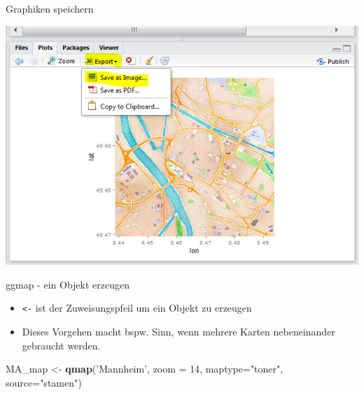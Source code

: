 \documentclass[ignorenonframetext,]{beamer}
\newenvironment{Shaded}{\begin{snugshade}}{\end{snugshade}}
\newcommand{\DataTypeTok}[1]{\textcolor[rgb]{0.13,0.29,0.53}{#1}}
\newcommand{\DecValTok}[1]{\textcolor[rgb]{0.00,0.00,0.81}{#1}}
\newcommand{\KeywordTok}[1]{\textcolor[rgb]{0.13,0.29,0.53}{\textbf{#1}}}
\newcommand{\NormalTok}[1]{#1}
\newcommand{\StringTok}[1]{\textcolor[rgb]{0.31,0.60,0.02}{#1}}
\providecommand{\tightlist}{%
  \setlength{\itemsep}{0pt}\setlength{\parskip}{0pt}}
\begin{document}
\begin{frame}{Graphiken speichern}
\protect\hypertarget{graphiken-speichern}{}

\includegraphics{figure/RstudioExport.PNG}

\end{frame}

\begin{frame}[fragile]{ggmap - ein Objekt erzeugen}
\protect\hypertarget{ggmap---ein-objekt-erzeugen}{}

\begin{itemize}
\tightlist
\item
  \texttt{\textless{}-} ist der Zuweisungspfeil um ein Objekt zu
  erzeugen
\item
  Dieses Vorgehen macht bspw. Sinn, wenn mehrere Karten nebeneinander
  gebraucht werden.
\end{itemize}

\begin{Shaded}
\begin{Highlighting}[]
\NormalTok{MA_map <-}\StringTok{ }\KeywordTok{qmap}\NormalTok{(}\StringTok{'Mannheim'}\NormalTok{, }
               \DataTypeTok{zoom =} \DecValTok{14}\NormalTok{,}
               \DataTypeTok{maptype=}\StringTok{"toner"}\NormalTok{,}
               \DataTypeTok{source=}\StringTok{"stamen"}\NormalTok{)}
\end{Highlighting}
\end{Shaded}

\end{frame}
\end{document}
